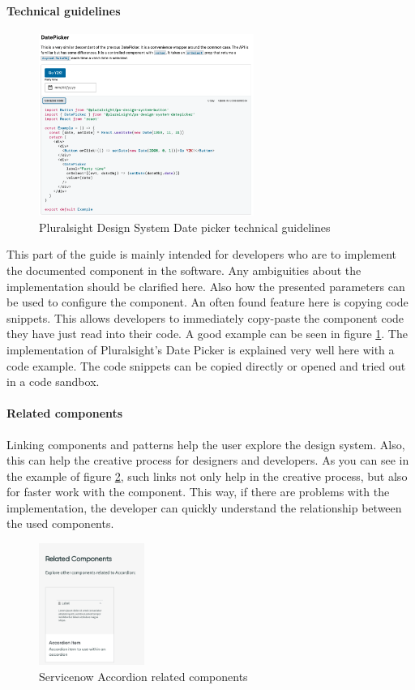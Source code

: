 \paragraph*{Technical guidelines} \label{tech_guideline}
\begin{figure}
	\includegraphics[width=7cm]{images/pluralsight_date-picker_technical.png}
	\caption{Pluralsight Design System Date picker technical guidelines \cite{pluralsight_datepicker_nodate}}
	\label{pluralsight_date_picker}
	\end{figure}
This part of the guide is mainly intended for developers who are to implement the documented component in the software. Any ambiguities about the implementation should be clarified here.  \cite{macdonald_practical_2019} Also how the presented parameters can be used to configure the component. An often found feature here is copying code snippets. This allows developers to immediately copy-paste the component code they have just read into their code. \cite{vesselov_building_2019} A good example can be seen in figure \ref{pluralsight_date_picker}. The implementation of Pluralsight's Date Picker is explained very well here with a code example. The code snippets can be copied directly or opened and tried out in a code sandbox.

\paragraph*{Related components} Linking components and patterns help the user explore the design system. Also, this can help the creative process for designers and developers.  \cite{vesselov_building_2019} As you can see in the example of figure \ref{servicenow_accordion}, such links not only help in the creative process, but also for faster work with the component. This way, if there are problems with the implementation, the developer can quickly understand the relationship between the used components.
\begin{figure}[htbp]
\centerline{\includegraphics[height=150px]{images/servicenow_accordion_related.png}}
\caption{Servicenow Accordion related components \cite{servicenow_now_nodate}}
\label{servicenow_accordion}
\end{figure}

